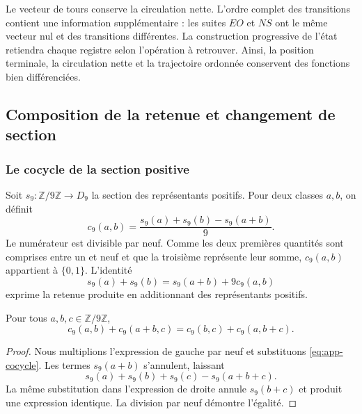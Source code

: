 Le vecteur de tours conserve la circulation nette. L'ordre complet des transitions contient une information supplémentaire : les suites $EO$ et $NS$ ont le même vecteur nul et des transitions différentes. La construction progressive de l'état retiendra chaque registre selon l'opération à retrouver. Ainsi, la position terminale, la circulation nette et la trajectoire ordonnée conservent des fonctions bien différenciées.

\subsection{Composition de la retenue et changement de section}
\label{sec:app-cociclo}

\subsubsection{Le cocycle de la section positive}

Soit $s_9:\mathbb Z/9\mathbb Z\to D_9$ la section des représentants positifs. Pour deux classes $a,b$, on définit
\begin{equation}
 c_9(a,b)=\frac{s_9(a)+s_9(b)-s_9(a+b)}9.
 \label{eq:app-cocycle}
\end{equation}
Le numérateur est divisible par neuf. Comme les deux premières quantités sont comprises entre un et neuf et que la troisième représente leur somme, $c_9(a,b)$ appartient à $\{0,1\}$. L'identité
\[
 s_9(a)+s_9(b)=s_9(a+b)+9c_9(a,b)
\]
exprime la retenue produite en additionnant des représentants positifs.

\begin{bloqueindivisible}
\begin{teorema}
\label{thm:app-cociclo}
Pour tous $a,b,c\in\mathbb Z/9\mathbb Z$,
\begin{equation}
 c_9(a,b)+c_9(a+b,c)
 =c_9(b,c)+c_9(a,b+c).
 \label{eq:app-cocycle-associativity}
\end{equation}
\end{teorema}

\begin{proof}
Nous multiplions l'expression de gauche par neuf et substituons \eqref{eq:app-cocycle}. Les termes $s_9(a+b)$ s'annulent, laissant
\[
 s_9(a)+s_9(b)+s_9(c)-s_9(a+b+c).
\]
La même substitution dans l'expression de droite annule $s_9(b+c)$ et produit une expression identique. La division par neuf démontre l'égalité.
\end{proof}
\end{bloqueindivisible}

